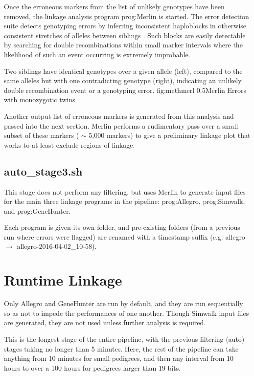 Once the erroneous markers from the list of unlikely genotypes have been removed, the linkage analysis program \gls{prog:Merlin} is started. The error detection suite detects genotyping errors by inferring inconsistent haploblocks in otherwise consistent stretches of alleles between siblings \cite{merlin}. Such blocks are easily detectable by searching for double recombinations within small marker intervals where the likelihood of such an event occurring is extremely improbable.

{Two siblings have identical genotypes over a given allele (left), compared to the same alleles but with one contradicting genotype (right), indicating an unlikely double recombination event or a genotyping error.}
{fig:methmerl}
{0.5}{Merlin Errors with monozygotic twins}

Another output list of erroneous markers is generated from this analysis and passed into the next section. Merlin performs a rudimentary pass over a small subset of these markers ( $\sim$ 5,000 markers) to give a preliminary linkage plot that works to at least exclude regions of linkage.

\subsection{auto\_stage3.sh}

This stage does not perform any filtering, but uses Merlin to generate input files for the main three linkage programs in the pipeline: \gls{prog:Allegro}, \gls{prog:Simwalk}, and \gls{prog:GeneHunter}.

Each program is given its own folder, and pre-existing folders (from a previous run where errors were flagged) are renamed with a timestamp suffix (e.g. allegro \(\rightarrow\) allegro-2016-04-02\_10-58).


\section{Runtime Linkage}

Only Allegro and GeneHunter are run by default, and they are run sequentially so as not to impede the performances of one another. Though Simwalk input files are generated, they are not used unless further analysis is required.

This is the longest stage of the entire pipeline, with the previous filtering (auto) stages taking no longer than 5 minutes. Here, the rest of the pipeline can take anything from 10 minutes for small pedigrees, and then any interval from 10 hours to over a 100 hours for pedigrees larger than 19 bits.

